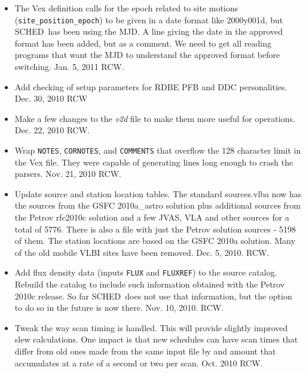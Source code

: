 \documentclass{report}
\newcommand{\schedb}{{\sc SCHED~}}
\begin{document}
\begin{itemize}
\item The Vex definition calls for the epoch related to site motions
({\tt site\_position\_epoch}) to be given in a date format like
2000y001d, but \schedb has been using the MJD.  A line giving the date
in the approved format has been added, but as a comment.  We need to
get all reading programs that want the MJD to understand the approved
format before switching.  Jan. 5, 2011 RCW.

\item Add checking of setup parameters for RDBE PFB and DDC personalities.
Dec. 30, 2010  RCW

\item Make a few changes to the {\sl v2d} file to make them more
useful for operations.  Dec. 22, 2010  RCW.

\item Wrap {\tt NOTES}, {\tt CORNOTES}, and {\tt COMMENTS} that
overflow the 128 character limit in the Vex file.  They were capable of
generating lines long enough to crash the parsers.  Nov. 21, 2010 RCW.

\item Update source and station location tables.  The standard
sources.vlba now has the sources from the GSFC 2010a\_astro solution
plus additional sources from the Petrov rfc2010c solution and a few
JVAS, VLA and other sources for a total of 5776.  There is also a file
with just the Petrov solution sources - 5198 of them.  The station
locations are based on the GSFC 2010a solution.  Many of the old
mobile VLBI sites have been removed.  Dec. 5, 2010.  RCW.

\item Add flux density data (inputs {\tt FLUX} and {\tt FLUXREF}) to
the source catalog.  Rebuild the catalog to include such information
obtained with the Petrov 2010c release.  So far \schedb does not use
that information, but the option to do so in the future is now there.
Nov. 10, 2010.  RCW.

\item Tweak the way scan timing is handled.  This will provide slightly
improved slew calculations.  One impact is that new schedules can have
scan times that differ from old ones made from the same input file
by and amount that accumulates at a rate of a second or two per scan.
Oct. 2010  RCW.


\end{itemize}
\end{document}
